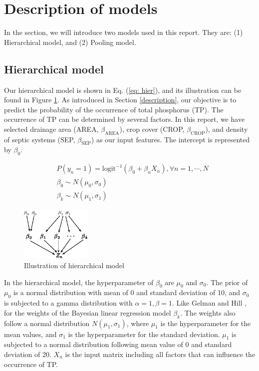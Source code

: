 \documentclass[a4paper]{artikel3}
\begin{document}
\section{Description of models}
\label{sec: models}
In the section, we will introduce two models used in this report. They are: (1) Hierarchical model, and (2) Pooling model. 

\subsection{Hierarchical model}
Our hierarchical model is shown in Eq. (\ref{eq: hier}), and its illustration can be found in Figure \ref{fig: hier_model_illustration}. As introduced in Section \ref{description}, our objective is to predict the probability of the occurrence of total phosphorus (TP). The occurrence of TP can be determined by several factors. In this report, we have selected drainage area (AREA, $\beta_\text{AREA}$), crop cover (CROP, $\beta_\text{CROP}$), and density of septic systems (SEP, $\beta_\text{SEP}$) as our input features. The intercept is represented by $\beta_0$. 


\begin{align}
    &P(y_n=1) = \text{logit}^{-1} (\beta_0+\beta_n  X_n), \forall n=1,\cdots,N\\
    &\beta_{0} \sim N(\mu_0,\sigma_0)\\
    &\beta_{k} \sim N(\mu_1,\sigma_1)
    \label{gp_eq}
\end{align}

\begin{figure}[!ht]
	\centering
	\includegraphics[width=0.3\textwidth]{./figures/hier_model.eps}
	\caption{Illustration of hierarchical model}
	\label{fig: hier_model_illustration}
\end{figure}

In the hierarchical model, the hyperparameter of $\beta_0$ are $\mu_0$ and $\sigma_0$. The prior of $\mu_0$ is a normal distribution with mean of 0 and standard deviation of 10, and $\sigma_0$ is subjected to a gamma distribution with $\alpha=1,\beta=1$. Like Gelman and Hill \cite{gelman2006data}, for the weights of the Bayesian linear regression model $\beta_{k}$. The weights also follow a normal distribution $N(\mu_1,\sigma_1)$, where ${\mu}_1$ is the hyperparameter for the mean values, and $\sigma_1$ is the hyperparameter for the standard deviation. ${\mu}_1$ is subjected to a normal distribution following mean value of 0 and standard deviation of 20. $X_n$ is the input matrix including all factors that can influence the occurrence of TP. 
\end{document}

